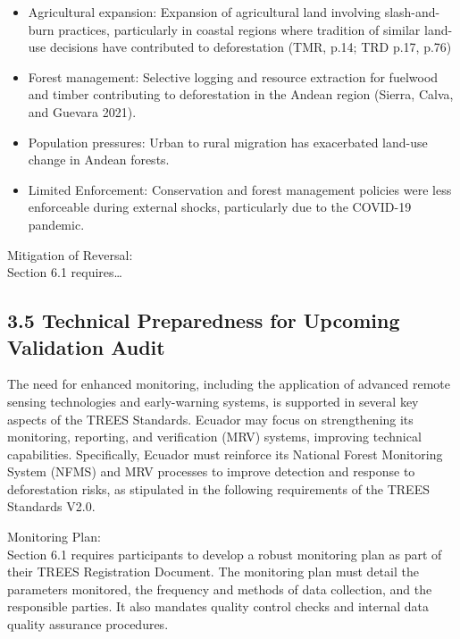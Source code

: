 \documentclass[
  letterpaper,
  DIV=11,
  numbers=noendperiod]{scrartcl}
\begin{document}
\begin{itemize}
\item
  Agricultural expansion: Expansion of agricultural land involving
  slash-and-burn practices, particularly in coastal regions where
  tradition of similar land-use decisions have contributed to
  deforestation (TMR, p.14; TRD p.17, p.76)
\item
  Forest management: Selective logging and resource extraction for
  fuelwood and timber contributing to deforestation in the Andean region
  (Sierra, Calva, and Guevara 2021).
\item
  Population pressures: Urban to rural migration has exacerbated
  land-use change in Andean forests.
\item
  Limited Enforcement: Conservation and forest management policies were
  less enforceable during external shocks, particularly due to the
  COVID-19 pandemic.
\end{itemize}

Mitigation of Reversal:\\
Section 6.1 requires\ldots{}

\hypertarget{technical-preparedness-for-upcoming-validation-audit}{%
\subsection{\texorpdfstring{\textbf{3.5 Technical Preparedness for
Upcoming Validation
Audit}}{3.5 Technical Preparedness for Upcoming Validation Audit}}\label{technical-preparedness-for-upcoming-validation-audit}}

The need for enhanced monitoring, including the application of advanced
remote sensing technologies and early-warning systems, is supported in
several key aspects of the TREES Standards. Ecuador may focus on
strengthening its monitoring, reporting, and verification (MRV) systems,
improving technical capabilities. Specifically, Ecuador must reinforce
its National Forest Monitoring System (NFMS) and MRV processes to
improve detection and response to deforestation risks, as stipulated in
the following requirements of the TREES Standards V2.0.

Monitoring Plan:\\
Section 6.1 requires participants to develop a robust monitoring plan as
part of their TREES Registration Document. The monitoring plan must
detail the parameters monitored, the frequency and methods of data
collection, and the responsible parties. It also mandates quality
control checks and internal data quality assurance
procedures\hspace{0pt}\hspace{0pt}.
\end{document}
